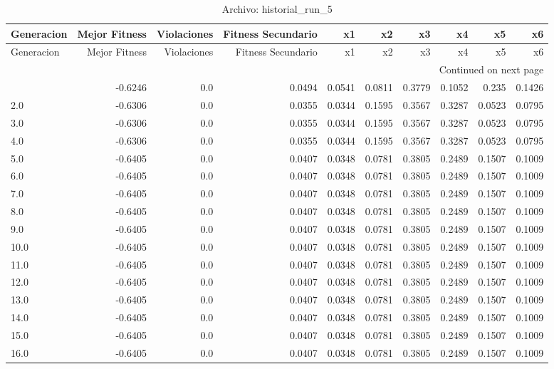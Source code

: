 \begin{longtable}{lrrrrrrrrr}
\caption{Archivo: historial\_run\_5}\label{tab:historial_run_5} \\
\toprule
Generacion & Mejor Fitness & Violaciones & Fitness Secundario & x1 & x2 & x3 & x4 & x5 & x6 \\
\midrule
\endfirsthead
\toprule
Generacion & Mejor Fitness & Violaciones & Fitness Secundario & x1 & x2 & x3 & x4 & x5 & x6 \\
\midrule
\endhead
\midrule
\multicolumn{10}{r}{Continued on next page} \\
\midrule
\endfoot
\bottomrule
\endlastfoot
1.0 & -0.6246 & 0.0 & 0.0494 & 0.0541 & 0.0811 & 0.3779 & 0.1052 & 0.235 & 0.1426 \\
2.0 & -0.6306 & 0.0 & 0.0355 & 0.0344 & 0.1595 & 0.3567 & 0.3287 & 0.0523 & 0.0795 \\
3.0 & -0.6306 & 0.0 & 0.0355 & 0.0344 & 0.1595 & 0.3567 & 0.3287 & 0.0523 & 0.0795 \\
4.0 & -0.6306 & 0.0 & 0.0355 & 0.0344 & 0.1595 & 0.3567 & 0.3287 & 0.0523 & 0.0795 \\
5.0 & -0.6405 & 0.0 & 0.0407 & 0.0348 & 0.0781 & 0.3805 & 0.2489 & 0.1507 & 0.1009 \\
6.0 & -0.6405 & 0.0 & 0.0407 & 0.0348 & 0.0781 & 0.3805 & 0.2489 & 0.1507 & 0.1009 \\
7.0 & -0.6405 & 0.0 & 0.0407 & 0.0348 & 0.0781 & 0.3805 & 0.2489 & 0.1507 & 0.1009 \\
8.0 & -0.6405 & 0.0 & 0.0407 & 0.0348 & 0.0781 & 0.3805 & 0.2489 & 0.1507 & 0.1009 \\
9.0 & -0.6405 & 0.0 & 0.0407 & 0.0348 & 0.0781 & 0.3805 & 0.2489 & 0.1507 & 0.1009 \\
10.0 & -0.6405 & 0.0 & 0.0407 & 0.0348 & 0.0781 & 0.3805 & 0.2489 & 0.1507 & 0.1009 \\
11.0 & -0.6405 & 0.0 & 0.0407 & 0.0348 & 0.0781 & 0.3805 & 0.2489 & 0.1507 & 0.1009 \\
12.0 & -0.6405 & 0.0 & 0.0407 & 0.0348 & 0.0781 & 0.3805 & 0.2489 & 0.1507 & 0.1009 \\
13.0 & -0.6405 & 0.0 & 0.0407 & 0.0348 & 0.0781 & 0.3805 & 0.2489 & 0.1507 & 0.1009 \\
14.0 & -0.6405 & 0.0 & 0.0407 & 0.0348 & 0.0781 & 0.3805 & 0.2489 & 0.1507 & 0.1009 \\
15.0 & -0.6405 & 0.0 & 0.0407 & 0.0348 & 0.0781 & 0.3805 & 0.2489 & 0.1507 & 0.1009 \\
16.0 & -0.6405 & 0.0 & 0.0407 & 0.0348 & 0.0781 & 0.3805 & 0.2489 & 0.1507 & 0.1009 \\

\end{longtable}
